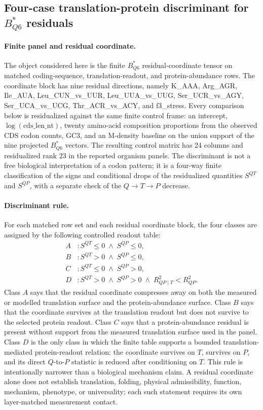 \subsection{Four-case translation-protein discriminant for $B^{*}_{Q6}$ residuals}
\label{sec:q6-four-case-translation-protein-discriminant-cross-layer}

\paragraph{Finite panel and residual coordinate.}
The object considered here is the finite $B^{*}_{Q6}$ residual-coordinate tensor on matched coding-sequence, translation-readout, and protein-abundance rows.  The coordinate block has nine residual directions, namely K\_AAA, Arg\_AGR, Ile\_AUA, Leu\_CUN\_vs\_UUR, Leu\_UUA\_vs\_UUG, Ser\_UCR\_vs\_AGY, Ser\_UCA\_vs\_UCG, Thr\_ACR\_vs\_ACY, and f3\_stress.  Every comparison below is residualized against the same finite control frame: an intercept, $\log(\mathrm{cds\_len\_nt})$, twenty amino-acid composition proportions from the observed CDS codon counts, GC3, and an M-density baseline on the union support of the nine projected $B^{*}_{Q6}$ vectors.  The resulting control matrix has 24 columns and residualized rank $23$ in the reported organism panels.  The discriminant is not a free biological interpretation of a codon pattern; it is a four-way finite classification of the signs and conditional drops of the residualized quantities $S^{QT}$ and $S^{QP}$, with a separate check of the $Q \to T \to P$ decrease.

\paragraph{Discriminant rule.}
For each matched row set and each residual coordinate block, the four classes are assigned by the following controlled readout table:
$$
\begin{aligned}
A &: S^{QT} \leq 0 \;\wedge\; S^{QP} \leq 0,\\
B &: S^{QT} > 0 \;\wedge\; S^{QP} \leq 0,\\
C &: S^{QT} \leq 0 \;\wedge\; S^{QP} > 0,\\
D &: S^{QT} > 0 \;\wedge\; S^{QP} > 0 \;\wedge\; R^{2}_{QP\mid T} < R^{2}_{QP}.
\end{aligned}
$$
Class $A$ says that the residual coordinate compresses away on both the measured or modelled translation surface and the protein-abundance surface.  Class $B$ says that the coordinate survives at the translation readout but does not survive to the selected protein readout.  Class $C$ says that a protein-abundance residual is present without support from the measured translation surface used in the panel.  Class $D$ is the only class in which the finite table supports a bounded translation-mediated protein-readout relation: the coordinate survives on $T$, survives on $P$, and its direct $Q$-to-$P$ statistic is reduced after conditioning on $T$.  This rule is intentionally narrower than a biological mechanism claim.  A residual coordinate alone does not establish translation, folding, physical admissibility, function, mechanism, phenotype, or universality; each such statement requires its own layer-matched measurement contact.

